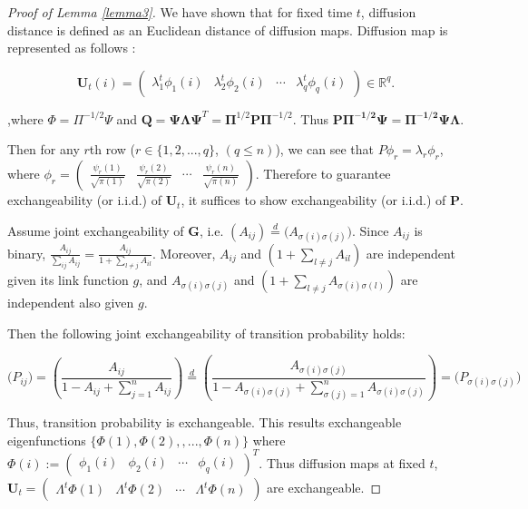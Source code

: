 \documentclass[12pt]{article}
\theoremstyle{definition}
\begin{document}
\begin{proof}[Proof of Lemma \ref{lemma3}]

We have shown that for fixed time $t$, diffusion distance is defined as an Euclidean distance of diffusion maps. Diffusion map is represented as follows :

\begin{equation}
\boldsymbol{U}_{t}(i) = \begin{pmatrix} \lambda^{t}_{1} \phi_{1}(i) & \lambda^{t}_{2} \phi_{2} (i)  & \cdots & \lambda^{t}_{q} \phi_{q}(i) \end{pmatrix} \in \mathbb{R}^{q}.
\end{equation}

,where $\Phi = \Pi^{-1/2}\Psi$ and $\mathbf{Q}=\mathbf{\Psi}\mathbf{\Lambda}\mathbf{\Psi}^{T} = \mathbf{\Pi}^{1/2} \mathbf{P} \mathbf{\Pi}^{-1/2}$. 
Thus $\mathbf{P \Pi^{-1/2} \Psi = \Pi^{-1/2} \Psi \Lambda}$. 

Then for any $r$th row ($r \in \{1,2, ... , q \}$, $(q \leq n)$), we can see that $P \phi_{r} = \lambda_{r} \phi_{r}$, where $\phi_{r} = \begin{pmatrix}  \frac{\psi_{r}(1)}{\sqrt{\pi(1)}} & \frac{\psi_{r}(2)}{\sqrt{\pi(2)}} & \cdots & \frac{\psi_{r}(n)}{\sqrt{\pi(n)}} \end{pmatrix}$.
Therefore to guarantee exchangeability (or i.i.d.) of $\mathbf{U}_{t}$, it suffices to show exchangeability (or i.i.d.) of $\mathbf{P}$.

Assume joint exchangeability of $\mathbf{G}$, i.e. $(A_{ij}) \stackrel{d}{=} \big( A_{\sigma(i) \sigma(j)} \big)$. 
Since $A_{ij}$ is binary, $\frac{A_{ij}}{\sum\limits_{ij} A_{ij}} = \frac{A_{ij}}{ 1 + \sum\limits_{l \neq j} A_{il}}$. Moreover, $A_{ij}$ and $(1 + \sum\limits_{l \neq j} A_{il})$ are independent given its link function $g$, and $A_{\sigma(i) \sigma(j)}$ and $(1 + \sum\limits_{l \neq j} A_{\sigma(i) \sigma(l)})$ are independent also given $g$.

Then the following joint exchangeability of transition probability holds:

\begin{equation}
\big( P_{ij} \big) = \left(  \frac{A_{ij}}{1 - A_{ij} + \sum\limits_{j=1}^{n} A_{ij} } \right)  \stackrel{d}{=} \left( \frac{A_{\sigma(i) \sigma(j)} }{1 - A_{\sigma(i) \sigma(j)} + \sum\limits_{\sigma(j) = 1}^{n} A_{\sigma(i) \sigma(j)} } \right) = \big( P_{\sigma(i) \sigma(j)} \big)
\end{equation}


Thus, transition probability is exchangeable. 
This results exchangeable eigenfunctions $\{ \Phi(1), \Phi(2), , ... , \Phi(n) \}$ 
where $\Phi(i) := \begin{pmatrix} \phi_{1}(i) & \phi_{2}(i) & \cdots & \phi_{q}(i) \end{pmatrix}^{T}$. Thus diffusion maps at fixed $t$, $\mathbf{U}_{t} = \begin{pmatrix} \Lambda^{t} \Phi(1)  & \Lambda^{t} \Phi(2) & \cdots & \Lambda^{t} \Phi(n)  \end{pmatrix}$ are exchangeable. 


\end{proof}
\end{document}
